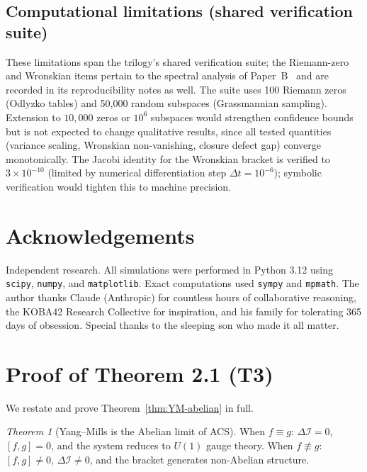 \documentclass[11pt,a4paper]{article}
\theoremstyle{plain}
\theoremstyle{definition}
\theoremstyle{remark}
\newtheorem*{theorem*}{Theorem}
\newcommand{\DI}{\Delta\mathcal{I}}
\begin{document}
\subsection*{Computational limitations (shared verification suite)}

These limitations span the trilogy's shared verification suite; the
Riemann-zero and Wronskian items pertain to the spectral analysis of
Paper~B~\cite{Wallace2026b} and are recorded in its reproducibility notes
as well.  The suite uses 100 Riemann zeros (Odlyzko tables) and
50{,}000 random subspaces (Grassmannian sampling).  Extension to
$10{,}000$ zeros or $10^6$ subspaces would strengthen confidence bounds
but is not expected to change qualitative results, since all tested
quantities (variance scaling, Wronskian non-vanishing, closure defect
gap) converge monotonically.  The Jacobi identity for the Wronskian
bracket is verified to $3 \times 10^{-10}$ (limited by numerical
differentiation step $\Delta t = 10^{-6}$); symbolic verification
would tighten this to machine precision.

\section*{Acknowledgements}

Independent research.  All simulations were performed in Python 3.12 
using \texttt{scipy}, \texttt{numpy}, and \texttt{matplotlib}.  Exact
computations used \texttt{sympy} and \texttt{mpmath}.  The author thanks
Claude (Anthropic) for countless hours of collaborative reasoning, the
KOBA42 Research Collective for inspiration, and his family for tolerating
365 days of obsession.  Special thanks to the sleeping son who made it all
matter.

\appendix

\clearpage
\section{Proof of Theorem 2.1 (T3)}
\label{app:T3}

We restate and prove Theorem~\ref{thm:YM-abelian} in full.

\begin{theorem*}[Yang--Mills is the Abelian limit of ACS]
When $f \equiv g$: $\DI = 0$, $[f,g] = 0$, and the system reduces to 
$U(1)$ gauge theory.  When $f \not\equiv g$: $[f,g] \neq 0$, 
$\DI \neq 0$, and the bracket generates non-Abelian structure.
\end{theorem*}
\end{document}
